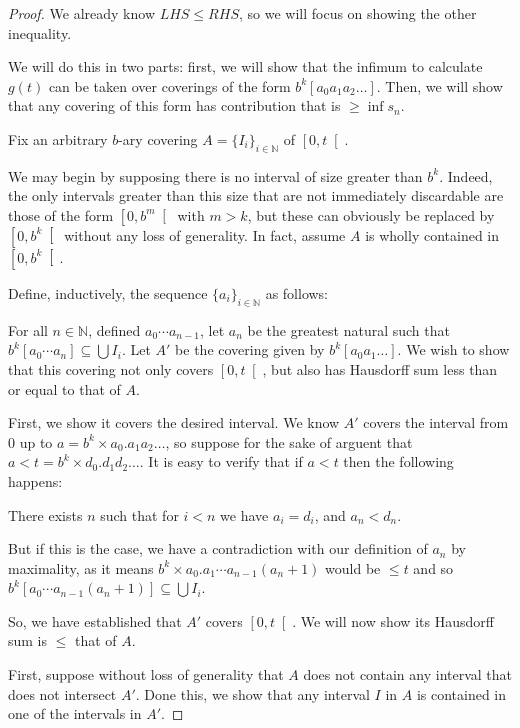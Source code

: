 \documentclass[11pt]{amsart}
\newcommand{\N}{\mathbb{N}}
\begin{document}
\begin{proof}
We already know $LHS \leq RHS$, so we will focus on showing the other inequality.

We will do this in two parts: first, we will show that the infimum to calculate $g(t)$ can be taken over coverings of the form $b^k [a_0 a_1 a_2 \dots]$. Then, we will show that any covering of this form has contribution that is $\geq \inf s_n$.

Fix an arbitrary $b$-ary covering $A = \{ I_i \}_{i \in \N}$ of $\left[ 0, t \right[$.

We may begin by supposing there is no interval of size greater than $b^k$. Indeed, the only intervals greater than this size that are not immediately discardable are those of the form $\left[0, b^m \right[$ with $m > k$, but these can obviously be replaced by $\left[0, b^k \right[$ without any loss of generality. In fact, assume $A$ is wholly contained in $\left[0, b^k \right[$.

Define, inductively, the sequence $\{a_i\}_{i \in \N}$ as follows:

For all $n \in \N$, defined $a_0 \cdots a_{n-1}$, let $a_n$ be the greatest natural such that $b^k [a_0 \cdots a_n] \subseteq \bigcup I_i$. Let $A'$ be the covering given by $b^k [a_0 a_1 \dots]$. We wish to show that this covering not only covers $\left[0, t \right[$, but also has Hausdorff sum less than or equal to that of $A$.

First, we show it covers the desired interval. We know $A'$ covers the interval from 0 up to $a = b^k \times a_0 . a_1 a_2 \dots$, so suppose for the sake of arguent that $a < t = b^k \times d_0 . d_1 d_2 \dots$. It is easy to verify that if $a < t$ then the following happens:

There exists $n$ such that for $i < n$ we have $a_i = d_i$, and $a_n < d_n$.

But if this is the case, we have a contradiction with our definition of $a_n$ by maximality, as it means $b^k \times a_0 . a_1 \cdots a_{n-1} (a_n + 1)$ would be $\leq t$ and so $b^k [a_0 \cdots a_{n-1} (a_n + 1)] \subseteq \bigcup I_i$.

So, we have established that $A'$ covers $\left[0, t\right[$. We will now show its Hausdorff sum is $\leq$ that of $A$.

First, suppose without loss of generality that $A$ does not contain any interval that does not intersect $A'$. Done this, we show that any interval $I$ in $A$ is contained in one of the intervals in $A'$.


\end{proof}
\end{document}
